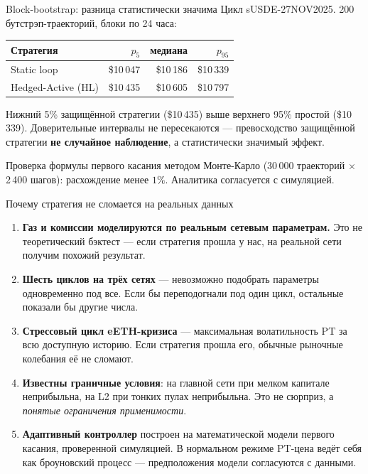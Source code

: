 \documentclass[11pt,aspectratio=169]{beamer}
\begin{document}
\begin{frame}{Block-bootstrap: разница статистически значима}
  Цикл sUSDE-27NOV2025. 200 бутстрэп-траекторий, блоки по 24 часа:

  \vspace{0.5em}
  \begin{center}
  \begin{tabular}{lrrr}
    \toprule
    Стратегия & $p_5$ & медиана & $p_{95}$ \\
    \midrule
    Static loop          & \$10\,047 & \$10\,186 & \$10\,339 \\
    Hedged-Active (HL)   & \$10\,435 & \$10\,605 & \$10\,797 \\
    \bottomrule
  \end{tabular}
  \end{center}

  \vspace{0.6em}
  Нижний 5\% защищённой стратегии (\$10\,435) выше верхнего 95\%
  простой (\$10\,339). Доверительные интервалы не пересекаются ---
  превосходство защищённой стратегии \textbf{не случайное наблюдение},
  а статистически значимый эффект.

  \vspace{0.5em}
  Проверка формулы первого касания методом Монте-Карло
  (30\,000 траекторий $\times$ 2\,400 шагов): расхождение менее $1\%$.
  Аналитика согласуется с симуляцией.
\end{frame}

\begin{frame}{Почему стратегия не сломается на реальных данных}
  \footnotesize
  \begin{enumerate}\itemsep0.3em
    \item \textbf{Газ и комиссии моделируются по реальным сетевым
          параметрам.} Это не теоретический бэктест --- если стратегия
          прошла у нас, на реальной сети получим похожий результат.
    \item \textbf{Шесть циклов на трёх сетях} --- невозможно подобрать
          параметры одновременно под все. Если бы переподогнали под
          один цикл, остальные показали бы другие числа.
    \item \textbf{Стрессовый цикл eETH-кризиса} --- максимальная
          волатильность PT за всю доступную историю. Если стратегия
          прошла его, обычные рыночные колебания её не сломают.
    \item \textbf{Известны граничные условия}: на главной сети при
          мелком капитале неприбыльна, на L2 при тонких пулах
          неприбыльна. Это не сюрприз, а \emph{понятые ограничения
          применимости}.
    \item \textbf{Адаптивный контроллер} построен на математической
          модели первого касания, проверенной симуляцией. В нормальном
          режиме PT-цена ведёт себя как броуновский процесс ---
          предположения модели согласуются с данными.
  \end{enumerate}
\end{frame}
\end{document}
